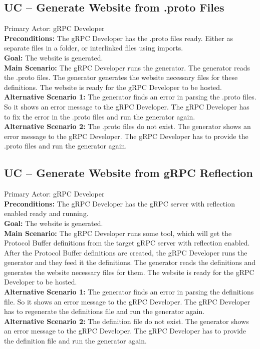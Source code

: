 \newcommand{\usecase}[2]{%
    \subsection{UC -- #1}
}


\usecase{Generate Website from .proto Files}

\textbf{Primary Actor:} gRPC Developer\\
\textbf{Preconditions:} The gRPC Developer has the .proto files ready.
Either as separate files in a folder, or interlinked files using imports.\\
\textbf{Goal:} The website is generated.\\
\textbf{Main Scenario:}
The gRPC Developer runs the generator.
The generator reads the .proto files.
The generator generates the website necessary files for these definitions.
The website is ready for the gRPC Developer to be hosted.\\
\textbf{Alternative Scenario 1:}
The generator finds an error in parsing the .proto files.
So it shows an error message to the gRPC Developer.
The gRPC Developer has to fix the error in the .proto files and run the generator again.\\
\textbf{Alternative Scenario 2:}
The .proto files do not exist.
The generator shows an error message to the gRPC Developer.
The gRPC Developer has to provide the .proto files and run the generator again.

\usecase{Generate Website from gRPC Reflection}

\textbf{Primary Actor:} gRPC Developer\\
\textbf{Preconditions:} The gRPC Developer has the gRPC server with reflection enabled ready and running.\\
\textbf{Goal:} The website is generated.\\
\textbf{Main Scenario:}
The gRPC Developer runs some tool, which will get the Protocol Buffer definitions from the target gRPC server with reflection enabled.
After the Protocol Buffer definitions are created, the gRPC Developer runs the generator and they feed it the definitions.
The generator reads the definitions and generates the website necessary files for them.
The website is ready for the gRPC Developer to be hosted.\\
\textbf{Alternative Scenario 1:}
The generator finds an error in parsing the definitions file.
So it shows an error message to the gRPC Developer.
The gRPC Developer has to regenerate the definitions file and run the generator again.\\
\textbf{Alternative Scenario 2:}
The definition file do not exist.
The generator shows an error message to the gRPC Developer.
The gRPC Developer has to provide the definition file and run the generator again.


